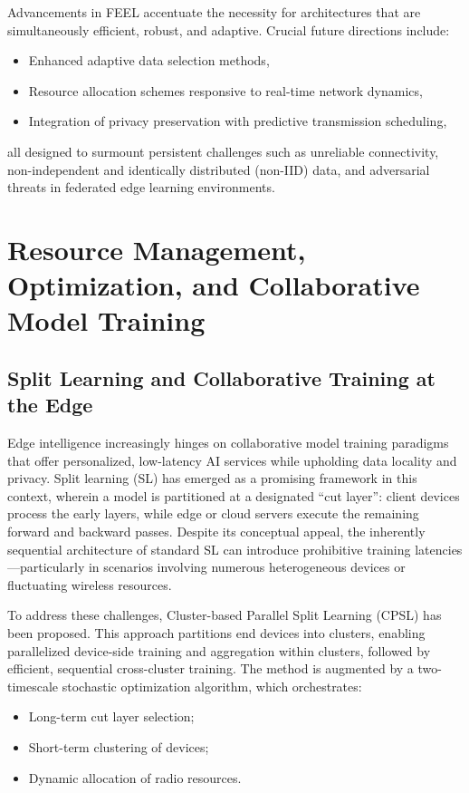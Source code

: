 Advancements in FEEL accentuate the necessity for architectures that are simultaneously efficient, robust, and adaptive. Crucial future directions include:
\begin{itemize}
    \item Enhanced adaptive data selection methods,
    \item Resource allocation schemes responsive to real-time network dynamics,
    \item Integration of privacy preservation with predictive transmission scheduling,
\end{itemize}
all designed to surmount persistent challenges such as unreliable connectivity, non-independent and identically distributed (non-IID) data, and adversarial threats in federated edge learning environments.

\section{Resource Management, Optimization, and Collaborative Model Training}
\label{sec:resource_management}

\subsection{Split Learning and Collaborative Training at the Edge}

Edge intelligence increasingly hinges on collaborative model training paradigms that offer personalized, low-latency AI services while upholding data locality and privacy. Split learning (SL) has emerged as a promising framework in this context, wherein a model is partitioned at a designated ``cut layer'': client devices process the early layers, while edge or cloud servers execute the remaining forward and backward passes. Despite its conceptual appeal, the inherently sequential architecture of standard SL can introduce prohibitive training latencies—particularly in scenarios involving numerous heterogeneous devices or fluctuating wireless resources.

To address these challenges, Cluster-based Parallel Split Learning (CPSL) has been proposed. This approach partitions end devices into clusters, enabling parallelized device-side training and aggregation within clusters, followed by efficient, sequential cross-cluster training. The method is augmented by a two-timescale stochastic optimization algorithm, which orchestrates:

\begin{itemize}
    \item Long-term cut layer selection;
    \item Short-term clustering of devices;
    \item Dynamic allocation of radio resources.
\end{itemize}

